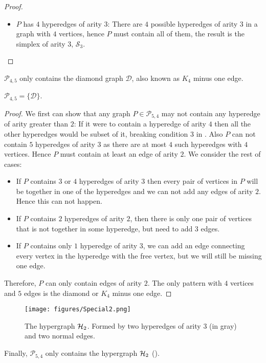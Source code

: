 \documentclass[a4paper,UKenglish,cleveref, autoref, numberwithinsect, thm-restate]{lipics-v2021}
\newcommand{\simplex}[1]{\cS_{#1}}
\newcommand{\hypertwo}{\cH_2}
\newcommand{\diamondgraph}{\cD}
\newcommand{\cD}{\mathcal{D}}
\newcommand{\cH}{{\cal H}}
\newcommand{\cP}{\mathcal{P}}
\newcommand{\cS}{\mathcal{S}}
\begin{document}
\begin{proof}
\begin{itemize}
			\item $P$ has $4$ hyperedges of arity $3$: There are $4$ possible hyperedges of arity $3$ in a graph with $4$ vertices, hence $P$ must contain all of them, the result is the simplex of arity $3$, $\simplex{3}$.
		\end{itemize}
	\end{proof}

	$\cP_{4,5}$ only contains the diamond graph $\diamondgraph$, also known as $K_4$ minus one edge.

	\begin{claim}
		$\mathcal{P}_{4,5} = \{\diamondgraph \}$.
	\end{claim}
	\begin{proof}
		We first can show that any graph $P \in \mathcal{P}_{5,4}$ may not contain any hyperedge of arity greater than $2$: If it were to contain a hyperedge of arity $4$ then all the other hyperedges would be subset of it, breaking condition $3$ in . Also $P$ can not contain $5$ hyperedges of arity $3$ as there are at most $4$ such hyperedges with $4$ vertices. Hence $P$ must contain at least an edge of arity $2$. We consider the rest of cases:
		\begin{itemize}
			\item If $P$ contains $3$ or $4$ hyperedges of arity $3$ then every pair of vertices in $P$ will be together in one of the hyperedges and we can not add any edges of arity $2$. Hence this can not happen.
			\item If $P$ contains $2$ hyperedges of arity $2$, then there is only one pair of vertices that is not together in some hyperedge, but need to add $3$ edges.
			\item If $P$ contains only $1$ hyperedge of arity $3$, we can add an edge connecting every vertex in the hyperedge with the free vertex, but we will still be missing one edge.
		\end{itemize}
		Therefore, $P$ can only contain edges of arity $2$. The only pattern with $4$ vertices and $5$ edges is the diamond or $K_4$ minus one edge.
	\end{proof}

	\begin{figure}
		\centering
		\texttt{[image: figures/Special2.png]}\caption{The hypergraph $\hypertwo$. Formed by two hyperedges of arity $3$ (in gray) and two normal edges.}
		\label{fig:hypertwo}
	\end{figure}
	
	Finally, $\mathcal{P}_{5,4}$ only contains the hypergraph $\hypertwo$ ().
	
\end{document}
